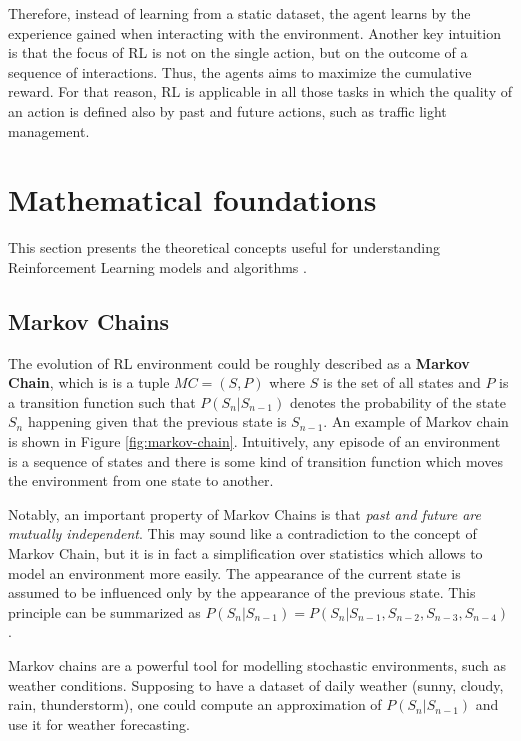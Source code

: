 Therefore, instead of learning from a static dataset, the agent learns by the experience gained when interacting with the environment.
Another key intuition is that the focus of RL is not on the single action, but on the outcome of a sequence of interactions. Thus, the agents aims to maximize the cumulative reward.
For that reason, RL is applicable in all those tasks in which the quality of an action is defined also by past and future actions, such as traffic light management.

\section{Mathematical foundations}

This section presents the theoretical concepts useful for understanding Reinforcement Learning models and algorithms \cite{sewak2019mathematical}.

\subsection{Markov Chains}

The evolution of RL environment could be roughly described as a \textbf{Markov Chain}, which is is a tuple $MC = (S, P)$ where $S$ is the set of all states and $P$ is a transition function such that $P(S_n | S_{n-1})$ denotes the probability of the state $S_n$ happening given that the previous state is $S_{n-1}$. An example of Markov chain is shown in Figure \ref{fig:markov-chain}. Intuitively, any episode of an environment is a sequence of states and there is some kind of transition function which moves the environment from one state to another.

Notably, an important property of Markov Chains is that \textit{past and future are mutually independent}. This may sound like a contradiction to the concept of Markov Chain, but it is in fact a simplification over statistics which allows to model an environment more easily. The appearance of the current state is assumed to be influenced only by the appearance of the previous state. This principle can be summarized as $P(S_n | S_{n-1}) = P(S_n | S_{n-1}, S_{n-2}, S_{n-3}, S_{n-4})$.

Markov chains are a powerful tool for modelling stochastic environments, such as weather conditions. Supposing to have a dataset of daily weather (sunny, cloudy, rain, thunderstorm), one could compute an approximation of $P(S_n | S_{n-1})$ and use it for weather forecasting.

